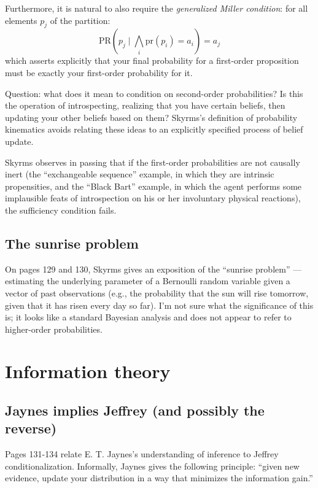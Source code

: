 \documentclass[letterpaper,12pt]{article}
\begin{document}
Furthermore, it is natural to also require the \emph{generalized Miller condition}: for all elements $p_j$ of the partition:
$$\text{PR}(p_j \mid \bigwedge_i \text{pr}(p_i) = a_i) = a_j$$
which asserts explicitly that your final probability for a first-order proposition must be exactly your first-order probability for it.

Question: what does it mean to condition on second-order probabilities? Is this the operation of introspecting, realizing that you have certain beliefs, then updating your other beliefs based on them? Skyrms's definition of probability kinematics avoids relating these ideas to an explicitly specified process of belief update.

Skyrms observes in passing that if the first-order probabilities are not causally inert (the ``exchangeable sequence'' example, in which they are intrinsic propensities, and the ``Black Bart'' example, in which the agent performs some implausible feats of introspection on his or her involuntary physical reactions), the sufficiency condition fails.

\subsection{The sunrise problem}
On pages 129 and 130, Skyrms gives an exposition of the ``sunrise problem'' --- estimating the underlying parameter of a Bernoulli random variable given a vector of past observations (e.g., the probability that the sun will rise tomorrow, given that it has risen every day so far). I'm not sure what the significance of this is; it looks like a standard Bayesian analysis and does not appear to refer to higher-order probabilities.

\section{Information theory}
\subsection{Jaynes implies Jeffrey (and possibly the reverse)}
Pages 131-134 relate E. T. Jaynes's understanding of inference to Jeffrey conditionalization. Informally, Jaynes gives the following principle: ``given new evidence, update your distribution in a way that minimizes the information gain.''
\end{document}
